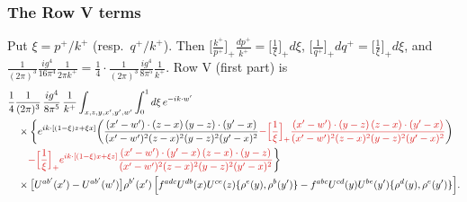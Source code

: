\documentclass[9pt]{article}
\newcommand{\R}[1]{{\color{cR}#1}}
\numberwithin{equation}{section}
\begin{document}
\subsubsection*{The Row V terms}
Put $\xi=p^{+}/k^{+}$ (resp.\ $q^{+}/k^{+}$). Then $\big[\frac{k^{+}}{p^{+}}\big]_{+}\frac{dp^{+}}{k^{+}}=\big[\frac1\xi\big]_{+}d\xi$, $\big[\frac{1}{q^{+}}\big]_{+}dq^{+}=\big[\frac1\xi\big]_{+}d\xi$, and $\frac{1}{(2\pi)^{3}}\frac{ig^{4}}{16\pi^{4}}\frac{1}{2\pi k^{+}}=\frac14\cdot\frac{1}{(2\pi)^{3}}\frac{ig^{4}}{8\pi^{5}}\frac{1}{k^{+}}$. Row V (first part) is
\begin{align}
&\frac14\frac{1}{(2\pi)^{3}}\,\frac{ig^{4}}{8\pi^{5}}\,\frac{1}{k^{+}}\int_{x,z,y,x',y',w'}\int_{0}^{1}d\xi\,e^{-ik\cdot w'}\notag\\
&\quad\times\bigg\{e^{ik\cdot[(1-\xi)z+\xi x]}\bigg(\frac{(x'-w')\cdot(z-x)\,(y-z)\cdot(y'-x)}{(x'-w')^{2}(z-x)^{2}(y-z)^{2}(y'-x)^{2}}\R{-\Big[\frac1\xi\Big]_{+}\frac{(x'-w')\cdot(y-z)\,(z-x)\cdot(y'-x)}{(x'-w')^{2}(z-x)^{2}(y-z)^{2}(y'-x)^{2}}}\bigg)\notag\\
&\qquad\R{-\Big[\frac1\xi\Big]_{+}e^{ik\cdot[(1-\xi)x+\xi z]}\frac{(x'-w')\cdot(y'-x)\,(z-x)\cdot(y-z)}{(x'-w')^{2}(z-x)^{2}(y-z)^{2}(y'-x)^{2}}}\bigg\}\notag\\
&\quad\times\big[U^{ab'}(x')-U^{ab'}(w')\big]\rho^{b'}(x')\,\Big[f^{adc}U^{db}(x)U^{ce}(z)\{\rho^{e}(y),\rho^{b}(y')\}-f^{abc}U^{cd}(y)U^{be}(y')\{\rho^{d}(y),\rho^{e}(y')\}\Big].
\end{align}
\end{document}
